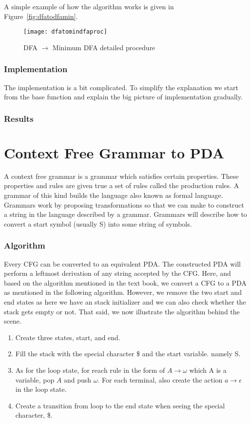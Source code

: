 \documentclass[
12pt, %
a4paper, %
oneside, %
headinclude,footinclude, %
BCOR5mm, %
]{scrartcl}
\begin{document}
A simple example of how the algorithm works is given in Figure~\vref{fig:dfatodfamin}.
\begin{figure}[tb]
	\centering 
	\texttt{[image: dfatomindfaproc]} 
	\caption[]{DFA $ \rightarrow $ Minimum DFA detailed procedure}
	\label{fig:dfatodfamin} 
\end{figure}
\subsubsection{Implementation}
The implementation is a bit complicated. To simplify the explanation we start from the base function and explain the big picture of implementation gradually.

\subsubsection{Results}

\section{Context Free Grammar to PDA}
A context free grammar is a grammar which satisfies certain properties. These properties and rules are given true a set of rules called the production rules. A grammar of this kind builds the language also known as formal language. Grammars work by proposing transformations so that we can make to construct a string in the language described by a grammar. Grammars will describe how to convert a start symbol (usually S) into some string of symbols.
\subsubsection{Algorithm}
Every CFG can be converted to an equivalent PDA. The constructed PDA will perform a leftmost derivation of any string accepted by the CFG. Here, and based on the algorithm mentioned in the text book, we convert a CFG to a PDA as mentioned in the following algorithm. However, we remove the two start and end states as here we have an stack initializer and we can also check whether the stack gets empty or not. That said, we now illustrate the algorithm behind the scene.

\begin{enumerate}
	\item Create three states, start, and end.
	\item Fill the stack with the special character \$ and the start variable. namely S.
	\item As for the loop state, for reach rule in the form of $A \rightarrow \omega$ which A is a variable, pop $A$ and push $\omega$. For each terminal, also create the action $a \rightarrow \epsilon$ in the loop state.
	\item Create a transition from loop to the end state when seeing the special character, \$.
\end{enumerate}
\end{document}
